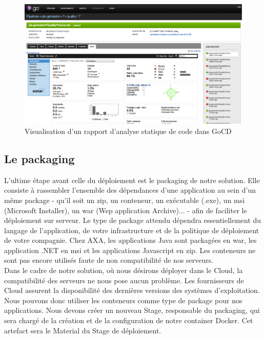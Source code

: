      \begin{figure}
        \begin{center}
          \includegraphics[scale=0.7]{images/GoCDSonar.png}
        \end{center}
        \caption{Visualisation d'un rapport d'analyse statique de code dans GoCD}
        \label{GoCDSonar}
      \end{figure}


      \subsection{Le packaging}
      L'ultime étape avant celle du déploiement est le packaging de notre solution. Elle consiste à rassembler l'ensemble des dépendances d'une application au sein d'un même package - qu'il soit un zip, un conteneur, un exécutable (.exe), un msi (Microsoft Installer), un war (Wep application Archive)... - afin de faciliter le déploiement sur serveur. Le type de package attendu dépendra essentiellement du langage de l'application, de votre infrastructure et de la politique de déploiement de votre compagnie. Chez AXA, les applications Java sont packagées en war, les application .NET en msi et les applications Javascript en zip. Les conteneurs ne sont pas encore utilisés faute de non compatibilité de nos serveurs.\\

      Dans le cadre de notre solution, où nous désirons déployer dans le Cloud, la compatibilité des serveurs ne nous pose aucun problème. Les fournisseurs de Cloud assurent la disponibilité des dernières versions des systèmes d'exploitation. Nous pouvons donc utiliser les conteneurs comme type de package pour nos applications. Nous devons créer un nouveau Stage, responsable du packaging, qui sera chargé de la création et de la configuration de notre container Docker. Cet artefact sera le Material du Stage de déploiement.

